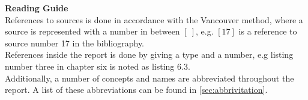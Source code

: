 \noindent \textbf{Reading Guide}\\
References to sources is done in accordance with the Vancouver method, where a source is represented with a number in between $[\ ]$, e.g. $[17]$ is a reference to source number 17 in the bibliography.
\\\indent
References inside the report is done by giving a type and a number, e.g listing number three in chapter six is noted as listing 6.3.
\\\indent
Additionally, a number of concepts and names are abbreviated throughout the report.
A list of these abbreviations can be found in \cref{sec:abbrivitation}.
